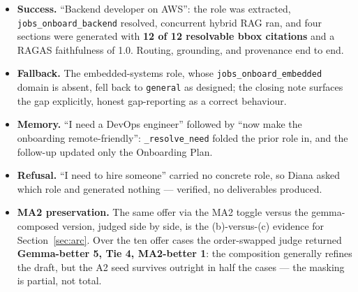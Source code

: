 \begin{itemize}
  \item \textbf{Success.} ``Backend developer on AWS'': the role was extracted,
    \verb|jobs_onboard_backend| resolved, concurrent hybrid RAG ran, and four sections were
    generated with \textbf{12 of 12 resolvable bbox citations} and a RAGAS faithfulness of
    1.0. Routing, grounding, and provenance end to end.
  \item \textbf{Fallback.} The embedded-systems role, whose \verb|jobs_onboard_embedded|
    domain is absent, fell back to \verb|general| as designed; the closing note surfaces the
    gap explicitly, honest gap-reporting as a correct behaviour.
  \item \textbf{Memory.} ``I need a DevOps engineer'' followed by ``now make the onboarding
    remote-friendly'': \verb|_resolve_need| folded the prior role in, and the follow-up
    updated only the Onboarding Plan.
  \item \textbf{Refusal.} ``I need to hire someone'' carried no concrete role, so Diana asked
    which role and generated nothing --- verified, no deliverables produced.
  \item \textbf{MA2 preservation.} The same offer via the MA2 toggle versus the
    gemma-composed version, judged side by side, is the (b)-versus-(c) evidence for
    Section~\ref{sec:arc}. Over the ten offer cases the order-swapped judge returned
    \textbf{Gemma-better 5, Tie 4, MA2-better 1}: the composition generally refines the
    draft, but the A2 seed survives outright in half the cases --- the masking is partial,
    not total.
\end{itemize}
